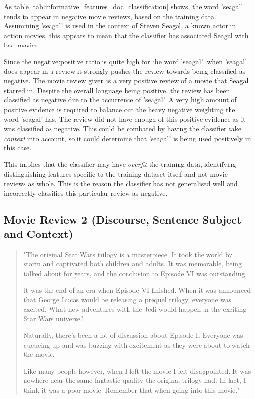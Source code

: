 \documentclass{article}
\begin{document}
As table \ref{tab:informative_features_doc_classification} shows, the word 'seagal' tends to appear in negative movie reviews, based on the training data. Assumming 'seagal' is used in the context of Steven Seagal, a known actor in action movies, this appears to mean that the classifier has associated Seagal with bad movies.

Since the negative:positive ratio is quite high for the word 'seagal', when 'seagal' does appear in a review it strongly pushes the review towards being classified as negative. The movie review given is a very positive review of a movie that Seagal starred in. Despite the overall language being positive, the review has been classified as negative due to the occurrence of 'seagal'. A very high amount of positive evidence is required to balance out the heavy negative weighting the word 'seagal' has. The review did not have enough of this positive evidence as it was classified as negative. This could be combated by having the classifier take \textit{context} into account, so it could determine that 'seagal' is being used positively in this case.

This implies that the classifier may have \textit{overfit} the training data, identifying distinguishing features specific to the training dataset itself and not movie reviews as whole. This is the reason the classifier has not generalised well and incorrectly classifies this particular review as negative.

\subsection{Movie Review 2 (Discourse, Sentence Subject and Context)}

\begin{quote}
"The original Star Wars trilogy is a masterpiece. It took the world by storm and captivated both children and adults. It was memorable, being talked about for years, and the conclusion to Episode VI was outstanding.

It was the end of an era when Episode VI finished. When it was announced that George Lucas would be releasing a prequel trilogy, everyone was excited. What new adventures with the Jedi would happen in the exciting Star Wars universe?

Naturally, there's been a lot of discussion about Episode I. Everyone was queueing up and was buzzing with excitement as they were about to watch the movie.

Like many people however, when I left the movie I felt disappointed. It was nowhere near the same fantastic quality the original trilogy had. In fact, I think it was a poor movie. Remember that when going into this movie."
\end{quote}
\end{document}
